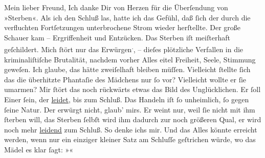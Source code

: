 \begin{ledgroupsized}[t]{13cm}
           \pstart\center{}Mein lieber Freund,\pend\pstart
           Ich danke Dir von Herzen für die Überſendung von »Sterben«. Als ich den Schluß las, hatte ich das Gefühl, daß ſich der durch die verfluchten
               Fortſetzungen unterbrochene Strom wieder herſtellte. Der große Schauer kam –
               Ergriffenheit und Entzücken. Das Sterben iſt meiſterhaft geſchildert. Mich ſtört nur
               das Erwürgen\substVorne{}\textsuperscript{.}\substDazwischen{},\substHinten{} – dieſes plötzliche Verfallen in die kriminaliſtiſche Brutalität, nachdem
                   vorher 
               Alles eitel Freiheit, Seele, Stimmung geweſen. Ich glaube, das {\pb}hätte zweiſelhaft bleiben müſſen. Vielleicht ſtellte
               ſich das die überhitzte Phantaſie des Mädchens \introOben{}nur\introOben{} ſo vor?
               Vielleicht wollte er ſie umarmen? Mir ſtört das noch rückwärts etwas das Bild des
               Unglücklichen. Er ſoll Einer ſein, der \uline{leidet}, bis
               zum Schluß. Das Handeln iſt ſo unheimlich, ſo gegen ſeine Natur. Der erwürgt nicht,
               glaub’ mirs. Er weint nur, weil ſie nicht mit ihm ſterben will, das Sterben ſelbſt
               wird ihm dadurch zur noch größeren Qual, er wird noch mehr \uline{leidend} zum Schluß. So denke ichs mir. Und {\pb}das Alles könnte erreicht werden, wenn nur ein einziger kleiner Satz am Schluſſe
               geſtrichen würde, wo das Mädel es klar ſagt: »\label{K_L02622-1v}\label{K_L02622-1h}«\pend
           \pstart

\end{ledgroupsized}
